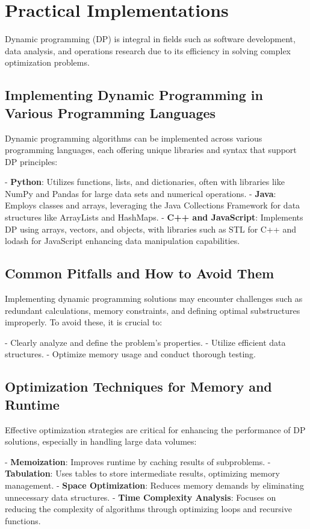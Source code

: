 \documentclass[12pt]{book} %
\begin{document}
\section{Practical Implementations}

Dynamic programming (DP) is integral in fields such as software development, data analysis, and operations research due to its efficiency in solving complex optimization problems.

\subsection{Implementing Dynamic Programming in Various Programming Languages}

Dynamic programming algorithms can be implemented across various programming languages, each offering unique libraries and syntax that support DP principles:

- \textbf{Python}: Utilizes functions, lists, and dictionaries, often with libraries like NumPy and Pandas for large data sets and numerical operations.
- \textbf{Java}: Employs classes and arrays, leveraging the Java Collections Framework for data structures like ArrayLists and HashMaps.
- \textbf{C++ and JavaScript}: Implements DP using arrays, vectors, and objects, with libraries such as STL for C++ and lodash for JavaScript enhancing data manipulation capabilities.

\subsection{Common Pitfalls and How to Avoid Them}

Implementing dynamic programming solutions may encounter challenges such as redundant calculations, memory constraints, and defining optimal substructures improperly. To avoid these, it is crucial to:

- Clearly analyze and define the problem's properties.
- Utilize efficient data structures.
- Optimize memory usage and conduct thorough testing.

\subsection{Optimization Techniques for Memory and Runtime}

Effective optimization strategies are critical for enhancing the performance of DP solutions, especially in handling large data volumes:

- \textbf{Memoization}: Improves runtime by caching results of subproblems.
- \textbf{Tabulation}: Uses tables to store intermediate results, optimizing memory management.
- \textbf{Space Optimization}: Reduces memory demands by eliminating unnecessary data structures.
- \textbf{Time Complexity Analysis}: Focuses on reducing the complexity of algorithms through optimizing loops and recursive functions.
\end{document}
